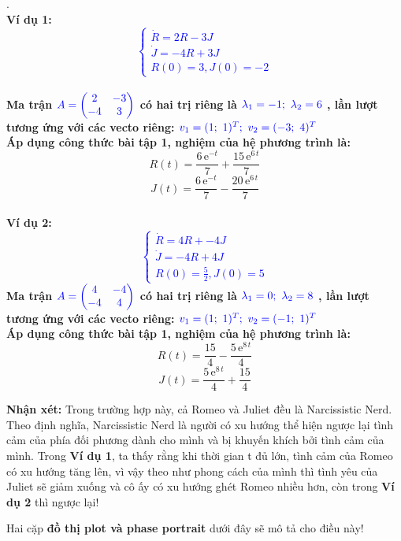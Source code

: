 \begin{tcbdoublebox}[title={2. Narcissistic Nerd and Narcissistic Nerd}]
\mdseries .\\
\bfseries Ví dụ 1: \\
\textcolor{blue}{$$\left\{\begin{matrix}
\dot{R} =  2R -3J \\ 
\dot{J} =  -4R+3J\\ 
R(0)= 3, J(0)=-2
\end{matrix}\right.$$}\\
\mdseries Ma trận $\color{blue}A=\begin{pmatrix}
2 & -3\\ 
-4 & 3
\end{pmatrix}$ có hai trị riêng là 
$\color{blue}\lambda_{1}=-1;\ \lambda_{2}=6$
, lần lượt tương ứng với các vecto riêng:
$\color{blue}v_{1} = (1;\ 1)^{T};\ v_{2}=(-3;\ 4)^{T}$\\Áp dụng công thức bài tập 1, nghiệm của hệ phương trình là:
$$R(t)=\frac{6\,{\mathrm{e}}^{-t}}{7}+\frac{15\,{\mathrm{e}}^{6\,t}}{7} $$
$$J(t)=\frac{6\,{\mathrm{e}}^{-t}}{7}-\frac{20\,{\mathrm{e}}^{6\,t}}{7}$$
\\
\bfseries Ví dụ 2:\\
\textcolor{blue}{$$\left\{\begin{matrix}
\dot{R} =  4R + -4J \\ 
\dot{J} =  -4R + 4J\\ 
R(0)= \frac{5}{2}, J(0)=5
\end{matrix}\right.$$}
\mdseries Ma trận $\color{blue}A=\begin{pmatrix}
4 & -4\\ 
-4 & 4
\end{pmatrix}$ có hai trị riêng là 
$\color{blue}\lambda_{1}=0;\ \lambda_{2}=8$
, lần lượt tương ứng với các vecto riêng:
$\color{blue}v_{1} = (1;\ 1)^{T};\ v_{2}=(-1;\ 1)^{T}$\\Áp dụng công thức bài tập 1, nghiệm của hệ phương trình là:
$$R(t)=\frac{15}{4}-\frac{5\,{\mathrm{e}}^{8\,t}}{4}$$
$$J(t)=\frac{5\,{\mathrm{e}}^{8\,t}}{4}+\frac{15}{4}$$

\textbf{Nhận xét: } Trong trường hợp này, cả Romeo và Juliet đều là Narcissistic Nerd. Theo định nghĩa, Narcissistic Nerd là người có xu hướng thể hiện ngược lại tình cảm của phía đối phương dành cho mình và bị khuyến khích bởi tình cảm của mình. Trong \textbf{Ví dụ 1}, ta thấy rằng khi thời gian t đủ lớn, tình cảm của Romeo có xu hướng tăng lên, vì vậy theo như phong cách
của mình thì tình yêu của Juliet sẽ giảm xuống và cô ấy có xu hướng ghét Romeo nhiều hơn, còn trong \textbf{Ví dụ 2} thì ngược lại!

Hai cặp \textbf{đồ thị plot và phase portrait} dưới đây sẽ mô tả cho điều này!
\end{tcbdoublebox}
